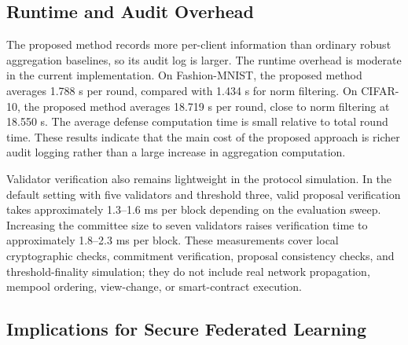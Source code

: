 \documentclass[preprint,authoryear,12pt]{elsarticle}
\begin{document}
\subsection{Runtime and Audit Overhead}

\begin{table}[t]
\centering
\caption{Runtime and audit-log overhead summary.}
\label{tab:overhead}
\end{table}

The proposed method records more per-client information than ordinary robust aggregation baselines, so its audit log is larger. The runtime overhead is moderate in the current implementation. On Fashion-MNIST, the proposed method averages 1.788 s per round, compared with 1.434 s for norm filtering. On CIFAR-10, the proposed method averages 18.719 s per round, close to norm filtering at 18.550 s. The average defense computation time is small relative to total round time. These results indicate that the main cost of the proposed approach is richer audit logging rather than a large increase in aggregation computation.

Validator verification also remains lightweight in the protocol simulation. In the default setting with five validators and threshold three, valid proposal verification takes approximately 1.3--1.6 ms per block depending on the evaluation sweep. Increasing the committee size to seven validators raises verification time to approximately 1.8--2.3 ms per block. These measurements cover local cryptographic checks, commitment verification, proposal consistency checks, and threshold-finality simulation; they do not include real network propagation, mempool ordering, view-change, or smart-contract execution.

\subsection{Implications for Secure Federated Learning}
\end{document}
